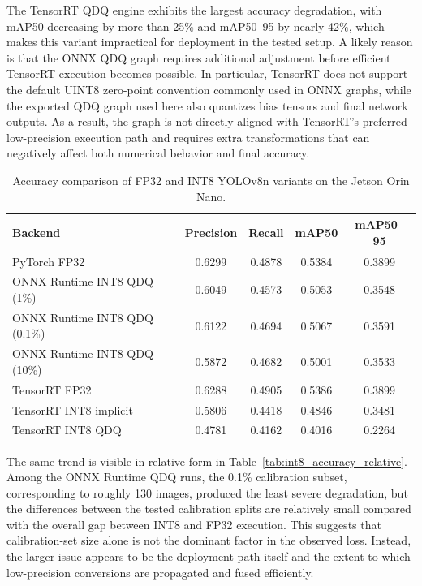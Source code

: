 \documentclass[12pt,a4paper]{report}
\begin{document}
The TensorRT QDQ engine exhibits the largest accuracy degradation, with mAP50 decreasing by more than 25\% and
mAP50--95 by nearly 42\%, which makes this variant impractical for deployment in the tested setup. A likely reason is
that the ONNX QDQ graph requires additional adjustment before efficient TensorRT execution becomes possible. In
particular, TensorRT does not support the default UINT8 zero-point convention commonly used in ONNX graphs, while the
exported QDQ graph used here also quantizes bias tensors and final network outputs. As a result, the graph is not
directly aligned with TensorRT's preferred low-precision execution path and requires extra transformations that can
negatively affect both numerical behavior and final accuracy.

\begin{table}[ht]
\centering
\caption{Accuracy comparison of FP32 and INT8 YOLOv8n variants on the Jetson Orin Nano.}
\label{tab:int8_accuracy_comparison}
\begin{tabular}{lcccc}
\toprule
Backend & Precision & Recall & mAP50 & mAP50--95 \\
\midrule
PyTorch FP32                  & 0.6299 & 0.4878 & 0.5384 & 0.3899 \\
ONNX Runtime INT8 QDQ (1\%)   & 0.6049 & 0.4573 & 0.5053 & 0.3548 \\
ONNX Runtime INT8 QDQ (0.1\%) & 0.6122 & 0.4694 & 0.5067 & 0.3591 \\
ONNX Runtime INT8 QDQ (10\%)  & 0.5872 & 0.4682 & 0.5001 & 0.3533 \\
TensorRT FP32                 & 0.6288 & 0.4905 & 0.5386 & 0.3899 \\
TensorRT INT8 implicit        & 0.5806 & 0.4418 & 0.4846 & 0.3481 \\
TensorRT INT8 QDQ             & 0.4781 & 0.4162 & 0.4016 & 0.2264 \\
\bottomrule
\end{tabular}
\end{table}

The same trend is visible in relative form in Table~\ref{tab:int8_accuracy_relative}. Among the ONNX Runtime QDQ
runs, the 0.1\% calibration subset, corresponding to roughly 130 images, produced the least severe degradation, but
the differences between the tested calibration splits are relatively small compared with the overall gap between INT8
and FP32 execution. This suggests that calibration-set size alone is not the dominant factor in the observed loss.
Instead, the larger issue appears to be the deployment path itself and the extent to which low-precision conversions
are propagated and fused efficiently.
\end{document}
